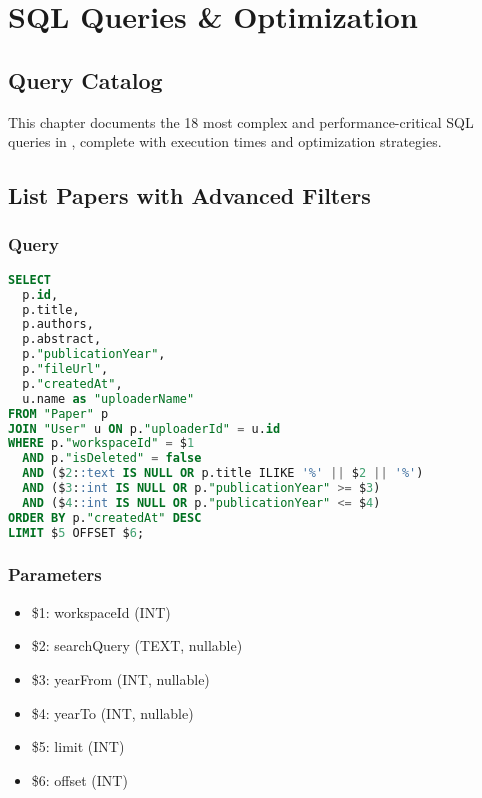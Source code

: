 \chapter{SQL Queries \& Optimization}
\label{ch:sql-queries}

\section{Query Catalog}
\label{sec:query-catalog}

This chapter documents the 18 most complex and performance-critical SQL queries in \projectname{}, complete with execution times and optimization strategies.

\section{List Papers with Advanced Filters}
\label{sec:query-list-papers}

\subsection{Query}

\begin{lstlisting}[language=SQL, caption={List Papers with Pagination \& Filters}]
SELECT 
  p.id,
  p.title,
  p.authors,
  p.abstract,
  p."publicationYear",
  p."fileUrl",
  p."createdAt",
  u.name as "uploaderName"
FROM "Paper" p
JOIN "User" u ON p."uploaderId" = u.id
WHERE p."workspaceId" = $1
  AND p."isDeleted" = false
  AND ($2::text IS NULL OR p.title ILIKE '%' || $2 || '%')
  AND ($3::int IS NULL OR p."publicationYear" >= $3)
  AND ($4::int IS NULL OR p."publicationYear" <= $4)
ORDER BY p."createdAt" DESC
LIMIT $5 OFFSET $6;
\end{lstlisting}

\subsection{Parameters}
\begin{itemize}
    \item \$1: workspaceId (INT)
    \item \$2: searchQuery (TEXT, nullable)
    \item \$3: yearFrom (INT, nullable)
    \item \$4: yearTo (INT, nullable)
    \item \$5: limit (INT)
    \item \$6: offset (INT)
\end{itemize}

